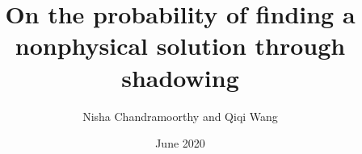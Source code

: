%
%
%
%
%
%
\RequirePackage{fix-cm}
%
\documentclass[smallextended]{svjour3}       %
%
\smartqed  %
%
%
%
%
\usepackage[utf8]{inputenc}
\usepackage{graphicx, float}
\usepackage{amsmath, amssymb, amsfonts}
\usepackage{mathtools,hyperref}
\usepackage{xcolor,verbatim}
\newcommand{\nisha}[1]{{\color{darkgreen} #1}}
\DeclarePairedDelimiter{\floor}{\lfloor}{\rfloor}


\title{On the probability of finding a nonphysical solution through shadowing}
\date{June 2020}



\author{Nisha Chandramoorthy and Qiqi Wang}



